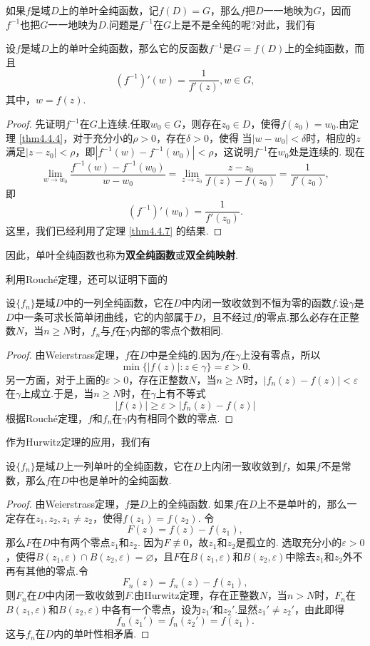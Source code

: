 如果$f$是域$D$上的单叶全纯函数，记$f(D)=G$，那么$f$把$D$一一地映为$G$，因而$f^{-1}$也把$G$一一地映为$D$.问题是$f^{-1}$在$G$上是不是全纯的呢?对此，我们有
\begin{theorem}\label{thm4.4.9}
设$f$是域$D$上的单叶全纯函数，那么它的反函数$f^{-1}$是$G=f(D)$上的全纯函数，而且
\[(f^{-1})'(w)=\frac1{f'(z)},w\in G,\]
其中，$w=f(z)$.
\end{theorem}
\begin{proof}
先证明$f^{-1}$在$G$上连续.任取$w_0\in G$，则存在$z_0\in D$，使得$f(z_0)=w_0$.由定理 \ref{thm4.4.4}，对于充分小的$\rho>0$，存在$\delta>0$，使得
当$|w-w_0|<\delta$时，相应的$z$满足$|z-z_0|<\rho$，即$|f^{-1}(w)-f^{-1}(w_0)|<\rho$，这说明$f^{-1}$在$w_0$处是连续的. 现在
\[\lim_{w\to w_0}\frac{f^{-1}(w)-f^{-1}(w_0)}{w-w_0}=\lim_{z\to z_0}\frac{z-z_0}{f(z)-f(z_0)}=\frac1{f'(z_0)},\]
即
\[(f^{-1})'(w_0)=\frac1{f'(z_0)}.\]
这里，我们已经利用了定理 \ref{thm4.4.7} 的结果.
\end{proof}

因此，单叶全纯函数也称为\textbf{双全纯函数}或\textbf{双全纯映射}.

利用Rouch\'e定理，还可以证明下面的
\begin{theorem}\label{thm4.4.10}
设$\{f_n\}$是域$D$中的一列全纯函数，它在$D$中内闭一致收敛到不恒为零的函数$f$.设$\gamma$是$D$中一条可求长简单闭曲线，它的内部属于$D$，且不经过$f$的零点.那么必存在正整数$N$，当$n\ge N$时，$f_n$与$f$在$\gamma$内部的零点个数相同.
\end{theorem}
\begin{proof}
由Weierstrass定理，$f$在$D$中是全纯的.因为$f$在$\gamma$上没有零点，所以
\[\min\{|f(z)|:z\in \gamma\}=\varepsilon>0.\]
另一方面，对于上面的$\varepsilon>0$，存在正整数$N$，当$n\ge N$时，$|f_n(z)-f(z)|<\varepsilon
$在$\gamma$上成立.于是，当$n\ge N$时，在$\gamma$上有不等式
\[|f(z)|\ge\varepsilon>|f_n(z)-f(z)|\]
根据Rouch\'e定理，$f$和$f_n$在$\gamma$内有相同个数的零点.
\end{proof}

作为Hurwitz定理的应用，我们有
\begin{theorem}\label{thm4.4.11}
设$\{f_n\}$是域$D$上一列单叶的全纯函数，它在$D$上内闭一致收敛到$f$，如果$f$不是常数，那么$f$在$D$中也是单叶的全纯函数.
\end{theorem}
\begin{proof}
由Weierstrass定理，$f$是$D$上的全纯函数. 如果$f$在$D$上不是单叶的，那么一定存在$z_1,z_2,z_1\ne z_2$，使得$f(z_1)=f(z_2)$. 令
\[F(z)=f(z)-f(z_1),\]
那么$F$在$D$中有两个零点$z_1$和$z_2$. 因为$F\not\equiv 0$，故$z_1$和$z_2$是孤立的. 选取充分小的$\varepsilon>0$，使得$B(z_1,\varepsilon)\cap B(z_2,\varepsilon)=\varnothing$，且$F$在$B(z_1,\varepsilon)$和$B(z_2,\varepsilon)$中除去$z_1$和$z_2$外不再有其他的零点.令
\[F_n(z)=f_n(z)-f(z_1),\]
则$F_n$在$D$中内闭一致收敛到$F$.由Hurwitz定理，存在正整数$N$，当$n>N$时，$F_n$在$B(z_1,\varepsilon)$和$ B(z_2,\varepsilon)$中各有一个零点，设为$z_1'$和$z_2'$.显然$z_1'\ne z_2' $，由此即得
\[f_n(z_1')=f_n(z_2')=f(z_1).\]
这与$f_n$在$D$内的单叶性相矛盾.
\end{proof}

